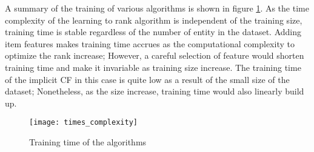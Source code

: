 \noindent A summary of the training of various algorithms is shown in figure \ref{training_time}. As the time complexity of the learning to rank algorithm is independent of the training size, training time is stable regardless of the number of entity in the dataset. Adding item features makes training time accrues as the computational complexity to optimize the rank increase; However, a careful selection of feature would shorten training time and make it invariable as training size increase. The training time of the implicit CF in this case is quite low as a result of the small size of the dataset; Nonetheless, as the size increase, training time would also linearly build up.

\begin{figure}[h]
	\texttt{[image: times\_complexity]}
	\centering
	\caption{Training time of the algorithms}
	\label{training_time}
\end{figure}
